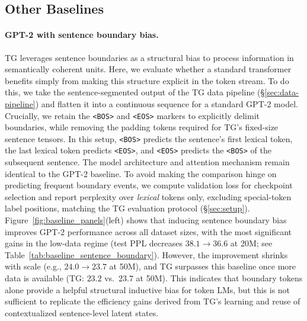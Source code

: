 \documentclass{article}
\begin{document}
\subsection{Other Baselines}

\paragraph{GPT-2 with sentence boundary bias.}
TG leverages sentence boundaries as a structural bias to process information in semantically coherent units. Here, we evaluate whether a standard transformer benefits simply from making this structure explicit in the token stream. To do this, we take the sentence-segmented output of the TG data pipeline (\S\ref{sec:data-pipeline}) and flatten it into a continuous sequence for a standard GPT-2 model. Crucially, we retain the \texttt{<BOS>} and \texttt{<EOS>} markers to explicitly delimit boundaries, while removing the padding tokens required for TG’s fixed-size sentence tensors. In this setup, \texttt{<BOS>} predicts the sentence’s first lexical token, the last lexical token predicts \texttt{<EOS>}, and \texttt{<EOS>} predicts the \texttt{<BOS>} of the subsequent sentence. The model architecture and attention mechanism remain identical to the GPT-2 baseline. To avoid making the comparison hinge on predicting frequent boundary events, we compute validation loss for checkpoint selection and report perplexity over \emph{lexical} tokens only, excluding special-token label positions, matching the TG evaluation protocol (\S\ref{sec:setup}). Figure~\ref{fig:baseline_panels}(left) shows that inducing sentence boundary bias improves GPT-2 performance across all dataset sizes, with the most significant gains in the low-data regime (test PPL decreases $38.1\!\rightarrow\!36.6$ at 20M; see Table~\ref{tab:baseline_sentence_boundary}). However, the improvement shrinks with scale (e.g., $24.0\!\rightarrow\!23.7$ at 50M), and TG surpasses this baseline once more data is available (TG: $23.2$ vs.\ $23.7$ at 50M). This indicates that boundary tokens alone provide a helpful structural inductive bias for token LMs, but this is not sufficient to replicate the efficiency gains derived from TG's learning and reuse of contextualized sentence-level latent states.
\end{document}
